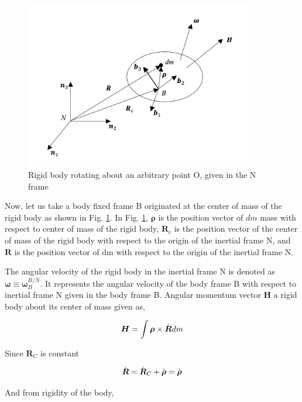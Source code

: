 \begin{figure}
\begin{center}
\includegraphics[width=10cm]{figures/attDyn2}    %
\caption{Rigid body rotating about an arbitrary point O, given in the N frame} 
\label{fig:attDyn2}
\end{center}
\end{figure}

Now, let us take a body fixed frame B originated at the center of mass of the rigid body as shown in Fig. \ref{fig:attDyn2}. 
In Fig. \ref{fig:attDyn2}, $\bm{\rho}$  is the position vector of $dm$ mass with respect to center of mass of the rigid body, $\bm{R}_c$ is the position vector of the center of mass of the rigid body with respect to the origin of the inertial frame N, and $\bm{R}$ is the position vector of dm with respect to the origin of the inertial frame N. 

The angular velocity of the rigid body in the inertial frame N is denoted as $\bm{\omega} \equiv \bm{\omega}_B^{B/N}$. 
It represents the angular velocity of the body frame B with respect to inertial frame N given in the body frame B. 
Angular momentum vector $\bm{H}$ a rigid body about its center of mass given as,

\begin{equation}{\label{eqn:kinematicEquDQM}}
\bm{H} = \int \bm{\rho} \times \dot{\bm{R}} dm
\end{equation}

Since $\bm{R}_C$ is constant

\begin{equation}{\label{eqn:kinematicEquDQM}}
\dot{\bm{R}} = \dot{\bm{R}}_C + \dot{\bm{\rho}} = \dot{\bm{\rho}}
\end{equation}

And from rigidity of the body,

